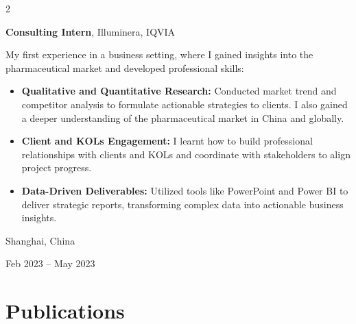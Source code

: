 \documentclass[10pt, letterpaper]{article}
\newenvironment{highlights}{
    \begin{itemize}[
        topsep=0.10 cm,
        parsep=0.10 cm,
        partopsep=0pt,
        itemsep=0pt,
        leftmargin=0.4 cm + 10pt
    ]
}{
    \end{itemize}
} %
\newenvironment{twocolentry}[2][]{
    \onecolentry
    \def\secondColumn{#2}
    \setcolumnwidth{\fill, 4.5 cm}
    \begin{paracol}{2}
}{
    \switchcolumn \raggedleft \secondColumn
    \end{paracol}
    \endonecolentry
} %
\begin{document}
        \vspace{0.3 cm}

        \begin{twocolentry}{
    Shanghai, China

    Feb 2023 – May 2023
}
    \textbf{Consulting Intern}, Illuminera, IQVIA

    \vspace{0.1cm}
    
    My first experience in a business setting, where I gained insights into the pharmaceutical market and developed professional skills:
    

    \begin{highlights}
        \item \textbf{Qualitative and Quantitative Research:} Conducted market trend and competitor analysis to formulate actionable strategies to clients. I also gained a deeper understanding of the pharmaceutical market in China and globally.

        \vspace{0.1cm}
        
        \item \textbf{Client and KOLs Engagement:} I learnt how to build professional relationships with clients and KOLs and coordinate with stakeholders to align project progress.

        \vspace{0.1cm}
        
        \item \textbf{Data-Driven Deliverables:} Utilized tools like PowerPoint and Power BI to deliver strategic reports, transforming complex data into actionable business insights.
    \end{highlights}
\end{twocolentry}

        \vspace{0.3 cm}


    
\section*{Publications}
\end{document}
